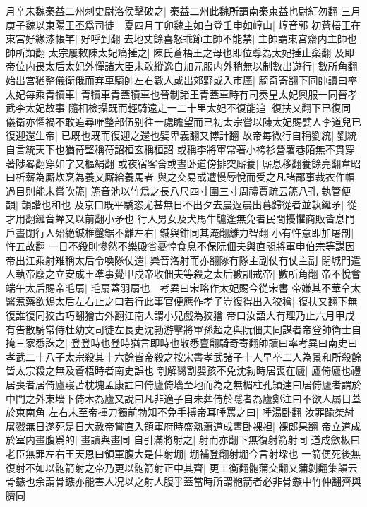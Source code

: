 月辛未魏秦益二州刺史尉洛侯擊破之|{
	秦益二州此魏所謂南秦東益也尉紆勿翻}
三月庚子魏以東陽王丕爲司徒　夏四月丁卯魏主如白登壬申如崞山|{
	崞音郭}
初蒼梧王在東宫好緣漆帳竿|{
	好呼到翻}
去地丈餘喜怒乖節主帥不能禁|{
	主帥謂東宮齋内主帥也帥所類翻}
太宗屢敕陳太妃痛捶之|{
	陳氏蒼梧王之母也即位尊為太妃捶止橤翻}
及即帝位内畏太后太妃外憚諸大臣未敢縱逸自加元服内外稍無以制數出遊行|{
	數所角翻}
始出宫猶整儀衛俄而弃車騎帥左右數人或出郊野或入市㕓|{
	騎奇寄翻下同帥讀曰率}
太妃每乘青犢車|{
	青犢車青蓋犢車也晉制諸王青蓋車時有司奏皇太妃輿服一同晉孝武李太妃故事}
隨相檢攝既而輕騎遠走一二十里太妃不復能追|{
	復扶又翻下已復同}
儀衛亦懼禍不敢追尋唯整部伍别往一處瞻望而已初太宗嘗以陳太妃賜嬖人李道兒已復迎還生帝|{
	已既也既而復迎之還也嬖卑義翻又博計翻}
故帝每微行自稱劉統|{
	劉統自言統天下也猶苻堅稱苻詔桓玄稱桓詔}
或稱李將軍常著小袴衫營署巷陌無不貫穿|{
	著陟畧翻穿如字又樞絹翻}
或夜宿客舍或晝卧道傍排突厮養|{
	厮息移翻養餘亮翻韋昭曰析薪為厮炊烹為養又厮給養馬者}
與之交易或遭慢辱悅而受之凡諸鄙事裁衣作帽過目則能未嘗吹箎|{
	箎音池以竹爲之長八尺四寸圍三寸周禮賈疏云箎八孔}
執管便韻|{
	韻諧也和也}
及京口既平驕恣尤甚無日不出夕去晨返晨出暮歸從者並執鋋矛|{
	從才用翻鋋音蟬又以前翻小矛也}
行人男女及犬馬牛驢逢無免者民間擾懼商販皆息門戶晝閉行人殆絶鍼椎鑿鋸不離左右|{
	鍼與鉗同其淹翻離力智翻}
小有忤意即加屠剖|{
	忤五故翻}
一日不殺則慘然不樂殿省憂惶食息不保阮佃夫與直閣將軍申伯宗等謀因帝出江乘射雉稱太后令喚隊仗還|{
	樂音洛射而亦翻隊有隊主副仗有仗主副}
閉城門遣人執帝廢之立安成王凖事覺甲戍帝收佃夫等殺之太后數訓戒帝|{
	數所角翻}
帝不悅會端午太后賜帝毛扇|{
	毛扇蓋羽扇也　考異曰宋略作太妃賜今從宋書}
帝嫌其不華令太醫煮藥欲鴆太后左右止之曰若行此事官便應作孝子豈復得出入狡獪|{
	復扶又翻下無復誰復同狡古巧翻獪古外翻江南人謂小兒戲為狡獪}
帝曰汝語大有理乃止六月甲戌有告散騎常侍杜幼文司徒左長史沈勃游擊將軍孫超之與阮佃夫同謀者帝登帥衛士自掩三家悉誅之|{
	登登時也登時猶言即時也散悉亶翻騎奇寄翻帥讀曰率考異曰南史曰孝武二十八子太宗殺其十六餘皆帝殺之按宋書孝武諸子十人早卒二人為景和所殺餘皆太宗殺之無及蒼梧時者南史誤也}
刳解臠割嬰孩不免沈勃時居喪在廬|{
	廬倚廬也禮居喪者居倚廬寢苫枕塊孟康註曰倚廬倚墻至地而為之無楣柱孔頴達曰居倚廬者謂於中門之外東墻下倚木為廬又說曰凡非適子自未葬倚於隱者為廬鄭注曰不欲人屬目蓋於東南角}
左右未至帝揮刀獨前勃知不免手搏帝耳唾罵之曰|{
	唾湯卧翻}
汝罪踰桀紂屠戮無日遂死是日大赦帝嘗直入領軍府時盛熱蕭道成晝卧裸袒|{
	裸郎果翻}
帝立道成於室内畫腹爲的|{
	畫讀與畫同}
自引滿將射之|{
	射而亦翻下無復射箭射同}
道成歛板曰老臣無罪左右王天恩曰領軍腹大是佳射堋|{
	堋補登翻射堋今言射垜也}
一箭便死後無復射不如以骲箭射之帝乃更以骲箭射正中其齊|{
	更工衡翻骲蒲交翻又蒲剝翻集韻云骨鏃也余謂骨鏃亦能害人况以之射人腹乎蓋當時所謂骲箭者必非骨鏃中竹仲翻齊與臍同}
